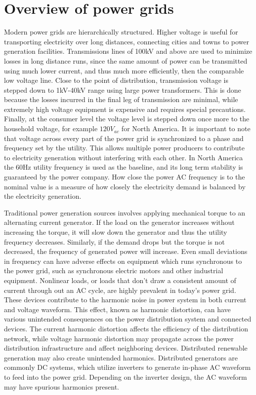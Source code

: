 \section{Overview of power grids}\label{sec:overview-of-power-grids}
Modern power grids are hierarchically structured.
Higher voltage is useful for transporting electricity over long distances, connecting cities and towns to power generation facilities.
Transmissions lines of 100kV and above are used to minimize losses in long distance runs, since the same amount of power can be transmitted using much lower current, and thus much more efficiently, then the comparable low voltage line.
Close to the point of distribution, transmission voltage is stepped down to 1kV-40kV range using large power transformers.
This is done because the losses incurred in the final leg of transmission are minimal, while extremely high voltage equipment is expensive and requires special precautions.\cite{sivanagaraju2008electric} Finally, at the consumer level the voltage level is stepped down once more to the household voltage, for example $120V_{ac}$ for North America.
It is important to note that voltage across every part of the power grid is synchronized to a phase and frequency set by the utility.
This allows multiple power producers to contribute to electricity generation without interfering with each other.\cite{blaabjerg2006overview} In North America the 60Hz utility frequency is used as the baseline, and its long term stability is guaranteed by the power company.
How close the power AC frequency is to the nominal value is a measure of how closely the electricity demand is balanced by the electricity generation.


Traditional power generation sources involves applying mechanical torque to an alternating current generator.
If the load on the generator increases without increasing the torque, it will slow down the generator and thus the utility frequency decreases.
Similarly, if the demand drops but the torque is not decreased, the frequency of generated power will increase.
Even small deviations in frequency can have adverse effects on equipment which runs synchronous to the power grid, such as synchronous electric motors and other industrial equipment.\cite{morren2006wind} Nonlinear loads, or loads that don't draw a consistent amount of current through out an AC cycle, are highly prevalent in today's power grid.
These devices contribute to the harmonic noise in power system in both current and voltage waveform.
This effect, known as harmonic distortion, can have various unintended consequences on the power distribution system and connected devices.
The current harmonic distortion affects the efficiency of the distribution network, while voltage harmonic distortion may propagate across the power distribution infrastructure and affect neighboring devices.\cite{muhamad2007effects} Distributed renewable generation may also create unintended harmonics.
Distributed generators are commonly DC systems, which utilize inverters to generate in-phase AC waveform to feed into the power grid.
Depending on the inverter design, the AC waveform may have spurious harmonics present.\cite{morren2006wind}

